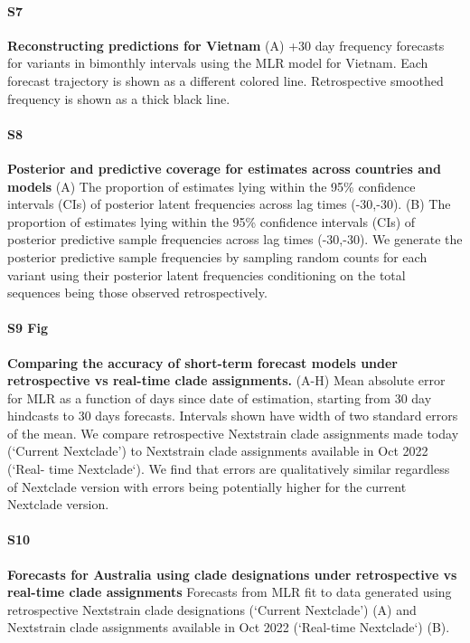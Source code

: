 \documentclass[10pt,letterpaper]{article}
\begin{document}
\paragraph*{S7}
\label{fig:S7}
{\bf Reconstructing predictions for Vietnam}
(A) +30 day frequency forecasts for variants in bimonthly intervals using the MLR model for Vietnam.
Each forecast trajectory is shown as a different colored line.
Retrospective smoothed frequency is shown as a thick black line.


\paragraph*{S8}
\label{fig:S8}
{\bf Posterior and predictive coverage for estimates across countries and models}
(A) The proportion of estimates lying within the 95\% confidence intervals (CIs) of posterior latent frequencies across lag times (-30,-30).
(B) The proportion of estimates lying within the 95\% confidence intervals (CIs) of posterior predictive sample frequencies across lag times (-30,-30).
We generate the posterior predictive sample frequencies by sampling random counts for each variant using their posterior latent frequencies conditioning on the total sequences being those observed retrospectively.

\paragraph*{S9 Fig}
\label{fig:S9}
{\bf Comparing the accuracy of short-term forecast models under retrospective vs real-time clade assignments.}
(A-H) Mean absolute error for MLR as a function of days
since date of estimation, starting from 30 day hindcasts to 30 days forecasts. Intervals shown have
width of two standard errors of the mean. We compare retrospective Nextstrain clade assignments
made today (‘Current Nextclade’) to Nextstrain clade assignments available in Oct 2022 (‘Real-
time Nextclade‘). We find that errors are qualitatively similar regardless of Nextclade version with
errors being potentially higher for the current Nextclade version.

\paragraph*{S10}
\label{fig:S10}
{\bf Forecasts for Australia using clade designations under retrospective vs real-time clade assignments}
Forecasts from MLR fit to data generated using retrospective Nextstrain clade designations (‘Current Nextclade’) (A) and Nextstrain clade assignments available
in Oct 2022 (‘Real-time Nextclade‘) (B).
\end{document}
